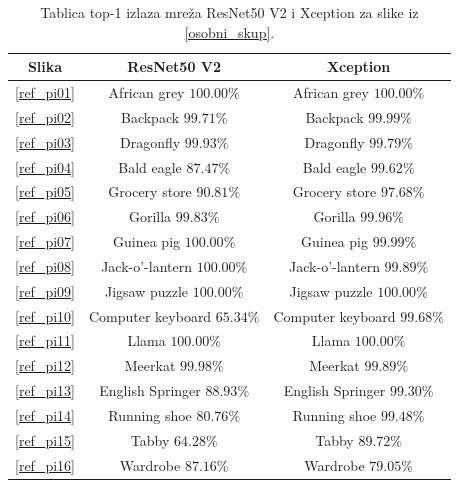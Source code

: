 \documentclass[utf8, diplomski]{fer}
\begin{document}
\begin{table}[H]
\begin{tabular}{|c | c | c|}
\hline
Slika & ResNet50 V2 & Xception \\ \hline
\ref{ref_pi01} & African grey $100.00\%$ & African grey $100.00\%$  \\ \hline
\ref{ref_pi02} & Backpack $99.71\%$ & Backpack $99.99\%$ \\ \hline
\ref{ref_pi03} & Dragonfly $99.93\%$ & Dragonfly $99.79\%$ \\ \hline
\ref{ref_pi04} & Bald eagle $87.47\%$ & Bald eagle $99.62\%$ \\  \hline
\ref{ref_pi05} & Grocery store $90.81\%$ & Grocery store $97.68\%$ \\ \hline
\ref{ref_pi06} & Gorilla $99.83\%$ & Gorilla $99.96\%$ \\ \hline
\ref{ref_pi07} & Guinea pig $100.00\%$ & Guinea pig $99.99\%$ \\ \hline
\ref{ref_pi08} & Jack-o'-lantern $100.00\%$ & Jack-o'-lantern $99.89\%$ \\ \hline
\ref{ref_pi09} & Jigsaw puzzle $100.00\%$ & Jigsaw puzzle $100.00\%$ \\ \hline
\ref{ref_pi10} & Computer keyboard $65.34\%$ & Computer keyboard $99.68\%$ \\ \hline
\ref{ref_pi11} & Llama $100.00\%$ & Llama $100.00\%$ \\ \hline
\ref{ref_pi12} & Meerkat $99.98\%$ & Meerkat $99.89\%$ \\ \hline
\ref{ref_pi13} & English Springer $88.93\%$ & English Springer $99.30\%$ \\ \hline
\ref{ref_pi14} & Running shoe $80.76\%$ & Running shoe $99.48\%$ \\ \hline
\ref{ref_pi15} & Tabby $64.28\%$ & Tabby $89.72\%$ \\ \hline
\ref{ref_pi16} & Wardrobe $87.16\%$ & Wardrobe $79.05\%$ \\ \hline
\end{tabular}
\caption{Tablica top-1 izlaza mreža ResNet50 V2 i Xception za slike iz \ref{osobni_skup}.}\label{regular_predictions}
\end{table}
\egroup
\end{document}

